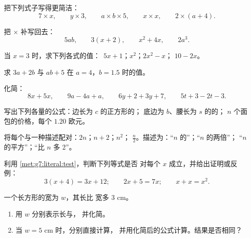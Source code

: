 \begin{exercise}[$\star$]\label{exo:g7:literal:1}
把下列式子写得更简洁：
\[
7 \times x, \qquad
y \times 3, \qquad
a \times b \times 5, \qquad
x \times x, \qquad
2 \times (a + 4).
\]
\end{exercise}

\begin{exercise}[$\star$]\label{exo:g7:literal:2}
把 $\times$ 补写回去：
\[
5ab, \qquad
3(x + 2), \qquad
x^2 + 4x, \qquad
2a^3 .
\]
\end{exercise}

\begin{exercise}[$\star$]\label{exo:g7:literal:3}
当 $x = 3$ 时，求下列各式的值：\ $5x + 1$；\quad $x^2$；\quad $2x^2 - x$；
\quad $10 - 2x$。
\end{exercise}

\begin{exercise}[$\star$]\label{exo:g7:literal:4}
求 $3a + 2b$ 与 $a b + 5$ 在 $a = 4$，$b = 1.5$ 时的值。
\end{exercise}

\begin{exercise}[$\star$]\label{exo:g7:literal:5}
化简：
\[
8x + 5x, \qquad
9a - 4a + a, \qquad
6y + 2 + 3y + 7, \qquad
5t + 3 - 2t - 3 .
\]
\end{exercise}

\begin{exercise}[$\star$]\label{exo:g7:literal:6}
写出下列各量的公式：边长为 $c$ 的正方形的；
底边为 $b$、腰长为 $s$ 的的；
$n$ 个面包的价格，每个 $1.20$ 欧元。
\end{exercise}

\begin{exercise}[$\star$]\label{exo:g7:literal:7}
将每个与一种描述配对：$2n$；$n + 2$；$n^2$；
$\frac n2$。描述为：“$n$ 的”；“$n$ 的两倍”；
“$n$ 的平方”；“比 $n$ 多 2”。
\end{exercise}

\begin{exercise}[$\star\star$]\label{exo:g7:literal:8}
利用 \cref{met:g7:literal:test}，判断下列等式是否
对每个 $x$ 成立，并给出证明或反例：
\[
3(x + 4) = 3x + 12; \qquad
2x + 5 = 7x; \qquad
x + x = x^2 .
\]
\end{exercise}

\begin{exercise}[$\star\star$]\label{exo:g7:literal:9}
一个长方形的宽为 $w$，其长比
宽多 $3$ cm。
\begin{enumerate}
  \item 用 $w$ 分别表示长与，
        并化简。
  \item 当 $w = 5$ cm 时，分别直接计算，
        并用化简后的公式计算。结果是否相同？
\end{enumerate}
\end{exercise}

